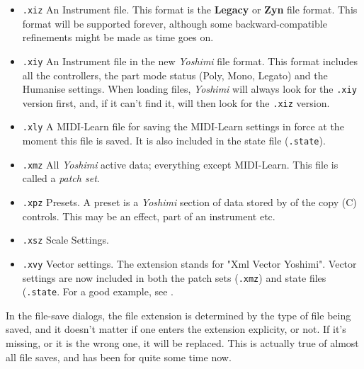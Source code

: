    \begin{itemize}
      \item \texttt{.xiz}
         An Instrument file.  This format is the \textbf{Legacy} or \textbf{Zyn}
         file format.  This format will be supported forever, although some
         backward-compatible refinements might be made as time goes on.
      \item \texttt{.xiy}
         An Instrument file in the new \textsl{Yoshimi} file format.
         This format includes all the
         controllers, the part mode status (Poly, Mono, Legato) and the
         Humanise settings.
         When loading files, \textsl{Yoshimi} will always look for
         the \texttt{.xiy} version first, and,
         if it can't find it, will then look for the \texttt{.xiz} version.
      \item \texttt{.xly}
         A MIDI-Learn file for saving the MIDI-Learn settings in force at the
         moment this file is saved.  It is also included in the state file
         (\texttt{.state}).
      \item \texttt{.xmz}
         All \textsl{Yoshimi} active data; everything except MIDI-Learn.
         This file is called a \textsl{patch set}.
      \item \texttt{.xpz}
         Presets.
         A preset is a \textsl{Yoshimi} section of data stored by of the copy
         (C) controls. This may be an effect, part of an instrument etc.
      \item \texttt{.xsz}
         Scale Settings.
      \item \texttt{.xvy}
         Vector settings. The extension stands for "Xml Vector Yoshimi".
         Vector settings are now included in both the patch sets
         (\texttt{.xmz}) and state files (\texttt{.state}.
         For a good example, see .
   \end{itemize}

   In the file-save dialogs, the file extension is determined by the type of
   file being saved, and it doesn't matter if one enters the extension
   explicity, or not. If it's missing, or it is the wrong one, it will be
   replaced. This is actually true of almost all file saves, and has been for
   quite some time now.

